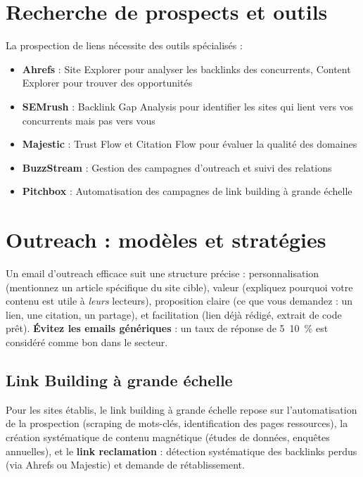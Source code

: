 \documentclass[12pt,a4paper,twoside]{report}
\newcommand{\keyword}[1]{\textbf{\textcolor{googleblue}{#1}}}
\newcommand{\important}[1]{\textbf{\textcolor{googlered}{#1}}}
\begin{document}
\section{Recherche de prospects et outils}

La prospection de liens nécessite des outils spécialisés :

\begin{itemize}
    \item \textbf{Ahrefs} : Site Explorer pour analyser les backlinks des concurrents, Content Explorer pour trouver des opportunités
    \item \textbf{SEMrush} : Backlink Gap Analysis pour identifier les sites qui lient vers vos concurrents mais pas vers vous
    \item \textbf{Majestic} : Trust Flow et Citation Flow pour évaluer la qualité des domaines
    \item \textbf{BuzzStream} : Gestion des campagnes d'outreach et suivi des relations
    \item \textbf{Pitchbox} : Automatisation des campagnes de link building à grande échelle
\end{itemize}

\section{Outreach : modèles et stratégies}

Un email d'outreach efficace suit une structure précise : personnalisation (mentionnez un article spécifique du site cible), valeur (expliquez pourquoi votre contenu est utile à \textit{leurs} lecteurs), proposition claire (ce que vous demandez : un lien, une citation, un partage), et facilitation (lien déjà rédigé, extrait de code prêt). \important{Évitez les emails génériques} : un taux de réponse de 5~10~\% est considéré comme bon dans le secteur.

\subsection{Link Building à grande échelle}

Pour les sites établis, le link building à grande échelle repose sur l'automatisation de la prospection (scraping de mots-clés, identification des pages ressources), la création systématique de contenu magnétique (études de données, enquêtes annuelles), et le \keyword{link reclamation} : détection systématique des backlinks perdus (via Ahrefs ou Majestic) et demande de rétablissement.
\end{document}
